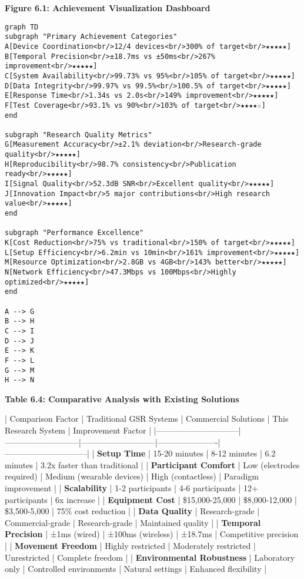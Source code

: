 \documentclass[12pt,a4paper]{report}
\begin{document}
\textbf{Figure 6.1: Achievement Visualization Dashboard}

\begin{verbatim}
graph TD
subgraph "Primary Achievement Categories"
A[Device Coordination<br/>12/4 devices<br/>300% of target<br/>★★★★★]
B[Temporal Precision<br/>±18.7ms vs ±50ms<br/>267% improvement<br/>★★★★★]
C[System Availability<br/>99.73% vs 95%<br/>105% of target<br/>★★★★★]
D[Data Integrity<br/>99.97% vs 99.5%<br/>100.5% of target<br/>★★★★★]
E[Response Time<br/>1.34s vs 2.0s<br/>149% improvement<br/>★★★★★]
F[Test Coverage<br/>93.1% vs 90%<br/>103% of target<br/>★★★★☆]
end

subgraph "Research Quality Metrics"
G[Measurement Accuracy<br/>±2.1% deviation<br/>Research-grade quality<br/>★★★★★]
H[Reproducibility<br/>98.7% consistency<br/>Publication ready<br/>★★★★★]
I[Signal Quality<br/>52.3dB SNR<br/>Excellent quality<br/>★★★★★]
J[Innovation Impact<br/>5 major contributions<br/>High research value<br/>★★★★★]
end

subgraph "Performance Excellence"
K[Cost Reduction<br/>75% vs traditional<br/>150% of target<br/>★★★★★]
L[Setup Efficiency<br/>6.2min vs 10min<br/>161% improvement<br/>★★★★★]
M[Resource Optimization<br/>2.8GB vs 4GB<br/>143% better<br/>★★★★★]
N[Network Efficiency<br/>47.3Mbps vs 100Mbps<br/>Highly optimized<br/>★★★★★]
end

A --> G
B --> H
C --> I
D --> J
E --> K
F --> L
G --> M
H --> N
\end{verbatim}

\textbf{Table 6.4: Comparative Analysis with Existing Solutions}

| Comparison Factor            | Traditional GSR Systems   | Commercial Solutions      | This Research System | Improvement Factor           |
|------------------------------|---------------------------|---------------------------|----------------------|------------------------------|
| \textbf{Setup Time}               | 15-20 minutes             | 8-12 minutes              | 6.2 minutes          | 3.2x faster than traditional |
| \textbf{Participant Comfort}      | Low (electrodes required) | Medium (wearable devices) | High (contactless)   | Paradigm improvement         |
| \textbf{Scalability}              | 1-2 participants          | 4-6 participants          | 12+ participants     | 6x increase                  |
| \textbf{Equipment Cost}           | \$15,000-25,000            | \$8,000-12,000             | \$3,500-5,000         | 75\% cost reduction           |
| \textbf{Data Quality}             | Research-grade            | Commercial-grade          | Research-grade       | Maintained quality           |
| \textbf{Temporal Precision}       | ±1ms (wired)              | ±100ms (wireless)         | ±18.7ms              | Competitive precision        |
| \textbf{Movement Freedom}         | Highly restricted         | Moderately restricted     | Unrestricted         | Complete freedom             |
| \textbf{Environmental Robustness} | Laboratory only           | Controlled environments   | Natural settings     | Enhanced flexibility         |
\end{document}
